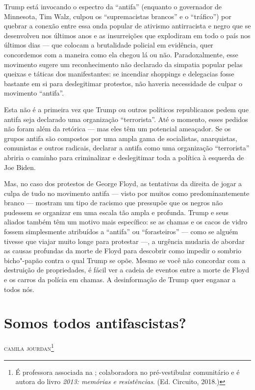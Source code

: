 Trump está invocando o espectro da ``antifa'' (enquanto o governador de Minnesota, Tim Walz, culpou os ``supremacistas brancos'' e o ``tráfico'') por quebrar a conexão entre essa onda popular de ativismo antirracista e negro que se desenvolveu nos últimos anos e as insurreições que explodiram em todo o país nos últimos dias — que colocam a brutalidade policial em evidência, quer concordemos com a maneira como ela chegou lá ou não. Paradoxalmente, esse movimento sugere um reconhecimento não declarado da simpatia popular pelas queixas e táticas dos manifestantes: se incendiar shoppings e delegacias fosse bastante em si para deslegitimar protestos, não haveria necessidade de culpar o movimento ``antifa''.
 
Esta não é a primeira vez que Trump ou outros políticos republicanos pedem que antifa seja declarado uma organização ``terrorista''. Até o momento, esses pedidos não foram além da retórica — mas eles têm um potencial ameaçador. Se os grupos antifa são compostos por uma ampla gama de socialistas, anarquistas, comunistas e outros radicais, declarar a antifa como uma organização ``terrorista'' abriria o caminho para criminalizar e deslegitimar toda a política à esquerda de Joe Biden.
 
Mas, no caso dos protestos de George Floyd, as tentativas da direita de jogar a culpa de tudo no movimento antifa — visto por muitos como predominantemente branco — mostram um tipo de racismo que pressupõe que os negros não pudessem se organizar em uma escala tão ampla e profunda. Trump e seus aliados também têm um motivo mais específico: se as chamas e os cacos de vidro fossem simplesmente atribuídos a ``antifa'' ou ``forasteiros'' — como se alguém tivesse que viajar muito longe para protestar —, a urgência mudaria de abordar as causas profundas da morte de Floyd para descobrir como impedir o sombrio bicho"-papão contra o qual Trump se opõe. Mesmo se você não concordar com a destruição de propriedades, é fácil ver a cadeia de eventos entre a morte de Floyd e os carros da polícia em chamas. A desinformação de Trump quer enganar a todos nós.



\chapter[Somos todos antifascistas?]{Somos todos antifascistas? }

\hfill{}\textsc{camila jourdan}\footnote{É professora associada na ; colaboradora no pré-vestibular
  comunitário  e é autora do livro \emph{2013: memórias e resistências}. (Ed.
  Circuito, 2018.)}

